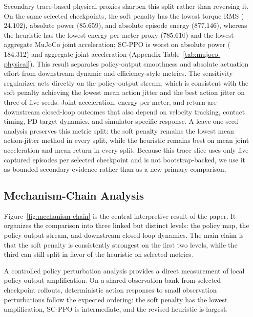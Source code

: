 \documentclass[10pt]{article}
\begin{document}
Secondary trace-based physical proxies sharpen this split rather than reversing
it. On the same selected checkpoints, the soft penalty has the lowest torque
RMS ($24.102$), absolute power ($85.659$), and absolute episode energy
($877.146$), whereas the heuristic has the lowest energy-per-meter proxy
($785.610$) and the lowest aggregate MuJoCo joint acceleration; SC-PPO is worst
on absolute power ($184.312$) and aggregate joint acceleration
(Appendix Table~\ref{tab:mujoco-physical}). This result separates
policy-output smoothness and absolute actuation effort from downstream dynamic
and efficiency-style metrics. The sensitivity regularizer acts directly on the
policy-output stream, which is consistent with the soft penalty achieving the
lowest mean action jitter and the best action jitter on three of five seeds.
Joint acceleration, energy per meter, and return are downstream closed-loop
outcomes that also depend on velocity tracking, contact timing, PD target
dynamics, and simulator-specific response. A leave-one-seed analysis preserves
this metric split: the soft penalty remains the lowest mean action-jitter
method in every split, while the heuristic remains best on mean joint
acceleration and mean return in every split. Because this trace slice uses only
five captured episodes per selected checkpoint and is not bootstrap-backed, we
use it as bounded secondary evidence rather than as a new primary comparison.

\subsection{Mechanism-Chain Analysis}

Figure~\ref{fig:mechanism-chain} is the central interpretive result of the
paper. It organizes the comparison into three linked but distinct levels: the
policy map, the policy-output stream, and downstream closed-loop dynamics. The
main claim is that the soft penalty is consistently strongest on the first two
levels, while the third can still split in favor of the heuristic on selected
metrics.

A controlled policy perturbation analysis provides a direct measurement of
local policy-output amplification. On a shared observation bank from
selected-checkpoint rollouts, deterministic action responses to small
observation perturbations follow the expected ordering: the soft penalty has
the lowest amplification, SC-PPO is intermediate, and the revised heuristic is
largest.
\end{document}
